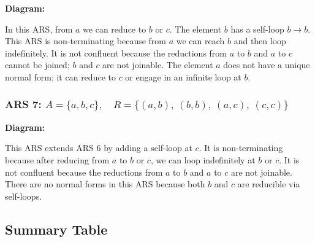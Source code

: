 \documentclass{article}
\theoremstyle{theorem}
\theoremstyle{definition}
\theoremstyle{remark}
\begin{document}
\textbf{Diagram:}

\begin{center}
\end{center}

In this ARS, from \( a \) we can reduce to \( b \) or \( c \). The element \( b \) has a self-loop \( b \to b \). This ARS is non-terminating because from \( a \) we can reach \( b \) and then loop indefinitely. It is not confluent because the reductions from \( a \) to \( b \) and \( a \) to \( c \) cannot be joined; \( b \) and \( c \) are not joinable. The element \( a \) does not have a unique normal form; it can reduce to \( c \) or engage in an infinite loop at \( b \).

\subsubsection*{ARS 7: \( A = \{a, b, c\},\quad R = \{(a, b),\ (b, b),\ (a, c),\ (c, c)\} \)}

\textbf{Diagram:}

\begin{center}
\end{center}

This ARS extends ARS 6 by adding a self-loop at \( c \). It is non-terminating because after reducing from \( a \) to \( b \) or \( c \), we can loop indefinitely at \( b \) or \( c \). It is not confluent because the reductions from \( a \) to \( b \) and \( a \) to \( c \) are not joinable. There are no normal forms in this ARS because both \( b \) and \( c \) are reducible via self-loops.

\subsection*{Summary Table}
\end{document}
